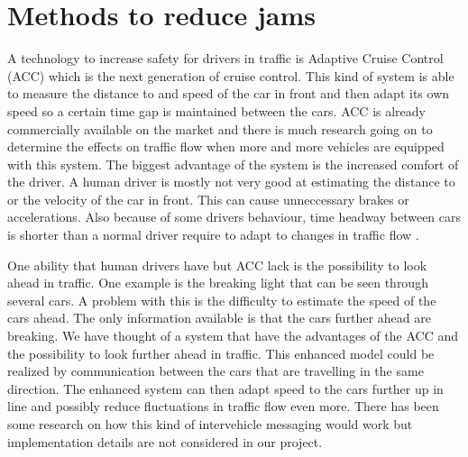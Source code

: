 \section{Methods to reduce jams}
A technology to increase safety for drivers in traffic is Adaptive Cruise
Control (ACC) which is the next generation of cruise control. This kind of
system is able to measure the distance to and speed of the car in front and then
adapt its own speed so a certain time gap is maintained between the cars. ACC
is already commercially available on the market and there is much research
going on to determine the effects on traffic flow when more and more vehicles are equipped with this system. The biggest advantage of the system is the increased comfort of the driver. A human driver is mostly not very good at estimating the distance to or the velocity of the car in front. This can cause unneccessary brakes or accelerations. Also because of some drivers behaviour, time headway between cars is shorter than a normal driver require to adapt to changes in traffic flow \cite{acc}.

One ability that human drivers have but ACC lack is the possibility to look
ahead in traffic. One example is the breaking light that can be seen through
several cars. A problem with this is the difficulty to estimate the speed of the
cars ahead. The only information available is that the cars further ahead are
breaking. We have thought of a system that have the advantages of the ACC and
the possibility to look further ahead in traffic. This enhanced model could
be realized by communication between the cars that are travelling in the same
direction. The enhanced system can then adapt speed to the cars further up in line and possibly reduce fluctuations in traffic flow even more. There has been some research on how this kind of intervehicle messaging would work  \cite{communication} but implementation details are not considered in our project.

